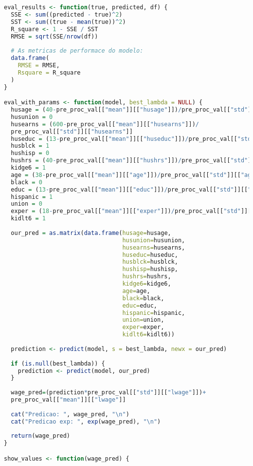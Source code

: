 \begin{lstlisting}[language=R, style=input]
eval_results <- function(true, predicted, df) {
  SSE <- sum((predicted - true)^2)
  SST <- sum((true - mean(true))^2)
  R_square <- 1 - SSE / SST
  RMSE = sqrt(SSE/nrow(df))
  
  # As metricas de performace do modelo:
  data.frame(
    RMSE = RMSE,
    Rsquare = R_square
  )
}

eval_with_params <- function(model, best_lambda = NULL) {
  husage = (40-pre_proc_val[["mean"]][["husage"]])/pre_proc_val[["std"]][["husage"]]
  husunion = 0
  husearns = (600-pre_proc_val[["mean"]][["husearns"]])/
  pre_proc_val[["std"]][["husearns"]]
  huseduc = (13-pre_proc_val[["mean"]][["huseduc"]])/pre_proc_val[["std"]][["huseduc"]]
  husblck = 1
  hushisp = 0
  hushrs = (40-pre_proc_val[["mean"]][["hushrs"]])/pre_proc_val[["std"]][["hushrs"]]
  kidge6 = 1
  age = (38-pre_proc_val[["mean"]][["age"]])/pre_proc_val[["std"]][["age"]]
  black = 0
  educ = (13-pre_proc_val[["mean"]][["educ"]])/pre_proc_val[["std"]][["educ"]]
  hispanic = 1
  union = 0
  exper = (18-pre_proc_val[["mean"]][["exper"]])/pre_proc_val[["std"]][["exper"]]
  kidlt6 = 1
  
  our_pred = as.matrix(data.frame(husage=husage, 
                                  husunion=husunion,
                                  husearns=husearns,
                                  huseduc=huseduc,
                                  husblck=husblck,
                                  hushisp=hushisp,
                                  hushrs=hushrs,
                                  kidge6=kidge6,
                                  age=age,
                                  black=black,
                                  educ=educ,
                                  hispanic=hispanic,
                                  union=union,
                                  exper=exper,
                                  kidlt6=kidlt6))
  
  prediction <- predict(model, s = best_lambda, newx = our_pred)
  
  if (is.null(best_lambda)) {
    prediction <- predict(model, our_pred)
  }
  
  wage_pred=(prediction*pre_proc_val[["std"]][["lwage"]])+
  pre_proc_val[["mean"]][["lwage"]]
  
  cat("Predicao: ", wage_pred, "\n")
  cat("Predicao exp: ", exp(wage_pred), "\n")
  
  return(wage_pred)
}

show_values <- function(wage_pred) {
  

\end{lstlisting}
